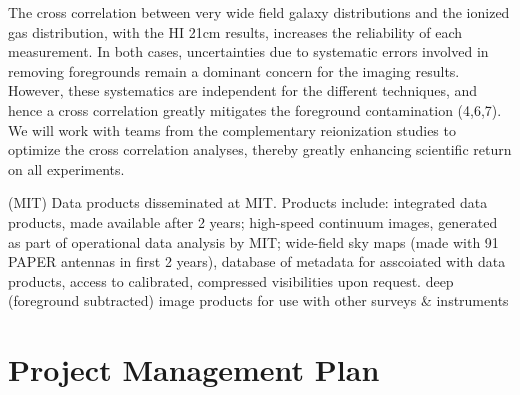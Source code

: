\documentclass[preprint]{aastex}
\begin{document}
The cross correlation between very wide field galaxy distributions and the ionized gas distribution, with the HI 21cm results, increases the reliability of each measurement. In both cases, uncertainties due to systematic errors involved in removing foregrounds remain a dominant concern for the imaging results. However, these systematics are independent for the different techniques, and hence a cross correlation greatly mitigates the foreground contamination (4,6,7). We will work with teams from the complementary reionization studies to optimize the cross correlation analyses, thereby greatly enhancing scientific return on all experiments. 

%
%
%
%
%
%
%

(MIT) Data products disseminated at MIT.  Products include:
integrated data products, made available after 2 years;
high-speed continuum images, generated as part of operational data analysis by MIT;
wide-field sky maps (made with 91 PAPER antennas in first 2 years),
database of metadata  for asscoiated with data products,
access to calibrated, compressed visibilities upon request.
deep (foreground subtracted) image products for use with other surveys \& instruments

\section{Project Management Plan}
\end{document}
